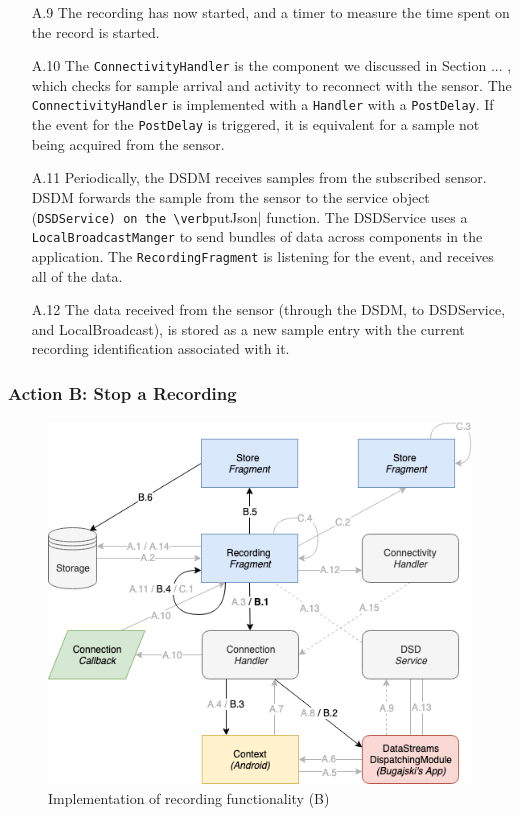 \begin{itemize}
	\item[A.9] The recording has now started, and a timer to measure the time spent on the record is started. 
	\item[A.10] The \verb|ConnectivityHandler| is the component we discussed in Section ... , which checks for sample arrival and activity to reconnect with the sensor. The \verb|ConnectivityHandler| is implemented with a \verb|Handler| with a \verb|PostDelay|. If the event for the \verb|PostDelay| is triggered, it is equivalent for a sample not being acquired from the sensor. 
	\item[A.11] Periodically, the DSDM receives samples from the subscribed sensor. DSDM forwards the sample from the sensor to the service object (\verb|DSDService) on the \verb|putJson| function. The DSDService uses a \verb|LocalBroadcastManger| to send bundles of data across components in the application. The \verb|RecordingFragment| is listening for the event, and receives all of the data. 
	\item[A.12] The data received from the sensor (through the DSDM, to DSDService, and LocalBroadcast), is stored as a new sample entry with the current recording identification associated with it. 
\end{itemize}

\subsubsection{Action B: Stop a Recording}
\begin{figure}
    \centering
    \includegraphics[scale=0.6]{images/Recording_ImpB.png}
    \caption{Implementation of recording functionality (B)}
    \label{fig:impl_recordingB}
\end{figure}


